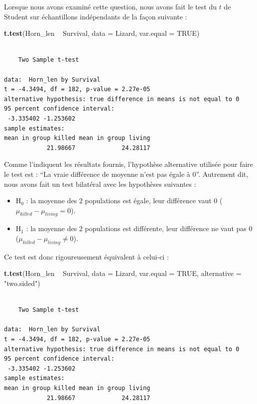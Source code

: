 \documentclass[a4paperpaper,]{article}
\newenvironment{Shaded}{\begin{snugshade}}{\end{snugshade}}
\newcommand{\DataTypeTok}[1]{\textcolor[rgb]{0.00,0.34,0.68}{#1}}
\newcommand{\KeywordTok}[1]{\textcolor[rgb]{0.12,0.11,0.11}{\textbf{#1}}}
\newcommand{\NormalTok}[1]{\textcolor[rgb]{0.12,0.11,0.11}{#1}}
\newcommand{\OperatorTok}[1]{\textcolor[rgb]{0.12,0.11,0.11}{#1}}
\newcommand{\OtherTok}[1]{\textcolor[rgb]{0.00,0.43,0.16}{#1}}
\newcommand{\StringTok}[1]{\textcolor[rgb]{0.75,0.01,0.01}{#1}}
\providecommand{\tightlist}{%
  \setlength{\itemsep}{0pt}\setlength{\parskip}{0pt}}
\begin{document}
Lorsque nous avons examiné cette question, nous avons fait le test du \(t\) de Student sur échantillons indépendants de la façon suivante :

\begin{Shaded}
\begin{Highlighting}[]
\KeywordTok{t.test}\NormalTok{(Horn_len }\OperatorTok{~}\StringTok{ }\NormalTok{Survival, }\DataTypeTok{data =}\NormalTok{ Lizard, }\DataTypeTok{var.equal =} \OtherTok{TRUE}\NormalTok{)}
\end{Highlighting}
\end{Shaded}

\begin{verbatim}

    Two Sample t-test

data:  Horn_len by Survival
t = -4.3494, df = 182, p-value = 2.27e-05
alternative hypothesis: true difference in means is not equal to 0
95 percent confidence interval:
 -3.335402 -1.253602
sample estimates:
mean in group killed mean in group living 
            21.98667             24.28117 
\end{verbatim}

Comme l'indiquent les résultats fournis, l'hypothèse alternative utilisée pour faire le test est : ``La vraie différence de moyenne n'est pas égale à 0''. Autrement dit, nous avons fait un test bilatéral avec les hypothèses suivantes :

\begin{itemize}
\tightlist
\item
  H\(_0\) : la moyenne des 2 populations est égale, leur différence vaut 0 (\(\mu_{killed}-\mu_{living} = 0\)).
\item
  H\(_1\) : la moyenne des 2 populations est différente, leur différence ne vaut pas 0 (\(\mu_{killed}-\mu_{living} \neq 0\)).
\end{itemize}

Ce test est donc rigoureusement équivalent à celui-ci :

\begin{Shaded}
\begin{Highlighting}[]
\KeywordTok{t.test}\NormalTok{(Horn_len }\OperatorTok{~}\StringTok{ }\NormalTok{Survival, }
       \DataTypeTok{data =}\NormalTok{ Lizard, }\DataTypeTok{var.equal =} \OtherTok{TRUE}\NormalTok{,}
       \DataTypeTok{alternative =} \StringTok{"two.sided"}\NormalTok{)}
\end{Highlighting}
\end{Shaded}

\begin{verbatim}

    Two Sample t-test

data:  Horn_len by Survival
t = -4.3494, df = 182, p-value = 2.27e-05
alternative hypothesis: true difference in means is not equal to 0
95 percent confidence interval:
 -3.335402 -1.253602
sample estimates:
mean in group killed mean in group living 
            21.98667             24.28117 
\end{verbatim}
\end{document}
